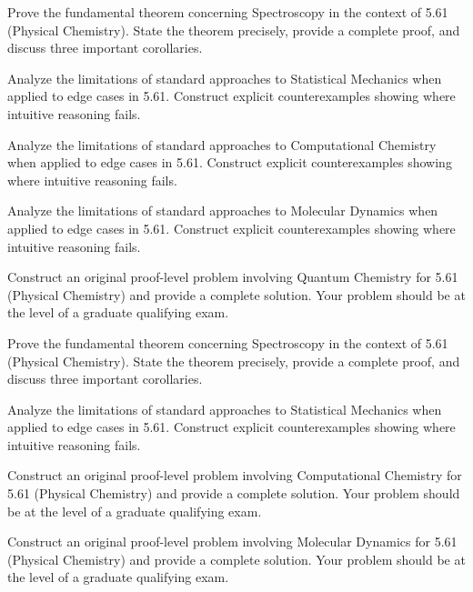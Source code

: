 \documentclass[12pt,a4paper]{exam}
\begin{document}
\begin{questions}
\vspace{0.3cm}

\question[7]
Prove the fundamental theorem concerning Spectroscopy in the context of 5.61 (Physical Chemistry). State the theorem precisely, provide a complete proof, and discuss three important corollaries.

\vspace{0.3cm}

\question[3]
Analyze the limitations of standard approaches to Statistical Mechanics when applied to edge cases in 5.61. Construct explicit counterexamples showing where intuitive reasoning fails.

\vspace{0.3cm}

\question[4]
Analyze the limitations of standard approaches to Computational Chemistry when applied to edge cases in 5.61. Construct explicit counterexamples showing where intuitive reasoning fails.

\vspace{0.3cm}

\question[4]
Analyze the limitations of standard approaches to Molecular Dynamics when applied to edge cases in 5.61. Construct explicit counterexamples showing where intuitive reasoning fails.

\vspace{0.3cm}

\question[2]
Construct an original proof-level problem involving Quantum Chemistry for 5.61 (Physical Chemistry) and provide a complete solution. Your problem should be at the level of a graduate qualifying exam.

\vspace{0.3cm}

\question[4]
Prove the fundamental theorem concerning Spectroscopy in the context of 5.61 (Physical Chemistry). State the theorem precisely, provide a complete proof, and discuss three important corollaries.

\vspace{0.3cm}

\question[2]
Analyze the limitations of standard approaches to Statistical Mechanics when applied to edge cases in 5.61. Construct explicit counterexamples showing where intuitive reasoning fails.

\vspace{0.3cm}

\question[5]
Construct an original proof-level problem involving Computational Chemistry for 5.61 (Physical Chemistry) and provide a complete solution. Your problem should be at the level of a graduate qualifying exam.

\vspace{0.3cm}

\question[4]
Construct an original proof-level problem involving Molecular Dynamics for 5.61 (Physical Chemistry) and provide a complete solution. Your problem should be at the level of a graduate qualifying exam.

\vspace{0.3cm}

\end{questions}
\end{document}
